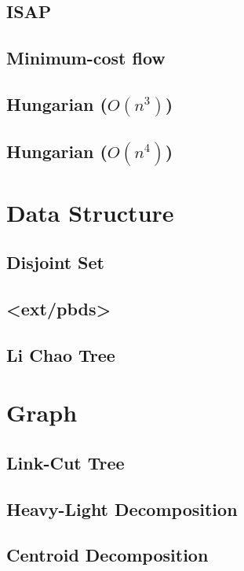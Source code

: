 \documentclass[a4paper,10pt,twocolumn,oneside]{article}
\begin{document}
\subsection{ISAP}

\subsection{Minimum-cost flow}

\subsection{Hungarian ($O(n^3)$)}

\subsection{Hungarian ($O(n^4)$)}

\section{Data Structure}
\subsection{Disjoint Set}

\subsection{<ext/pbds>}

\subsection{Li Chao Tree}

\section{Graph}
\subsection{Link-Cut Tree}

\subsection{Heavy-Light Decomposition}

\subsection{Centroid Decomposition}

\end{document}
